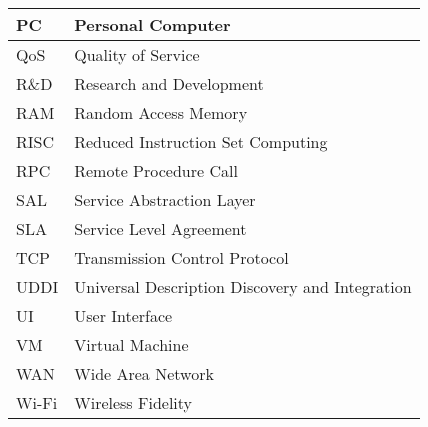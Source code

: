 \documentclass[publish]{IEEEtran}
\begin{document}
\begin{table}[t]
\begin{tabular}{|l| l|}
    \hline
     PC   & Personal Computer   \bigstrut\\
    \hline
     QoS   & Quality of Service   \bigstrut\\
    \hline
     R\&D   & Research and Development   \bigstrut\\
    \hline
     RAM   & Random Access Memory   \bigstrut\\
    \hline
     RISC   & Reduced Instruction Set Computing   \bigstrut\\
    \hline
     RPC   & Remote Procedure Call \bigstrut\\
    \hline
     SAL   & Service Abstraction Layer   \bigstrut\\
    \hline
     SLA   & Service Level Agreement   \bigstrut\\
    \hline
     TCP   & Transmission Control Protocol   \bigstrut\\
    \hline
     UDDI & Universal Description Discovery and Integration   \bigstrut\\
    \hline
     UI   & User Interface   \bigstrut\\
    \hline
     VM   & Virtual Machine   \bigstrut\\
    \hline
     WAN   & Wide Area Network   \bigstrut\\
    \hline
     Wi-Fi   & Wireless Fidelity   \bigstrut[t]\\
     \hline
    \end{tabular}\label{tab:addlabel}\end{table}
\end{document}
